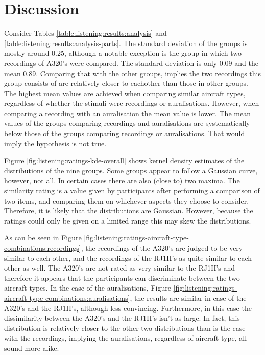 \section{Discussion}
Consider Tables \ref{table:listening:results:analysis} and
\ref{table:listening:results:analysis-parts}. The standard deviation of the
groups is mostly around 0.25, although a notable exception is the group in which
two recordings of A320's were compared. The standard deviation is only 0.09 and
the mean 0.89. Comparing that with the other groups, implies the two recordings
this group consists of are relatively closer to eachother than those in other
groups.
The highest mean values are achieved when comparing similar aircraft types,
regardless of whether the stimuli were recordings or auralisations. However,
when comparing a recording with an auralisation the mean value is lower. The
mean values of the groups comparing recordings and auralisations are
systematically below those of the groups comparing recordings or auralisations.
That would imply the hypothesis is not true.

Figure \ref{fig:listening:ratings-kde-overall} shows kernel density estimates of
the distributions of the nine groups. Some groups appear to follow a Gaussian
curve, however, not all. In certain cases there are also (close to) two maxima.
The similarity rating is a value given by participants after performing a
comparison of two items, and comparing them on whichever aspects they choose to
consider. Therefore, it is likely that the distributions are Gaussian. However,
because the ratings could only be given on a limited range this may skew the
distributions.


As can be seen in Figure
\ref{fig:listening:ratings-aircraft-type-combinations:recordings}, the recordings of the A320's
are judged to be very similar to each other, and the recordings of the RJ1H's as quite similar to
each other as well. The A320's are not rated as very similar to the RJ1H's and therefore
it appears that the participants can discriminate between the two aircraft
types.
In the case of the auralisations, Figure
\ref{fig:listening:ratings-aircraft-type-combinations:auralisations}, the
results are similar in case of the A320's and the RJ1H's, although less convincing.
Furthermore, in this case the dissimilarity between the A320's and the RJ1H's isn't as large.
In fact, this distribution is relatively closer to the other two distributions than is the case with the recordings,
implying the auralisations, regardless of aircraft type, all sound more alike.

